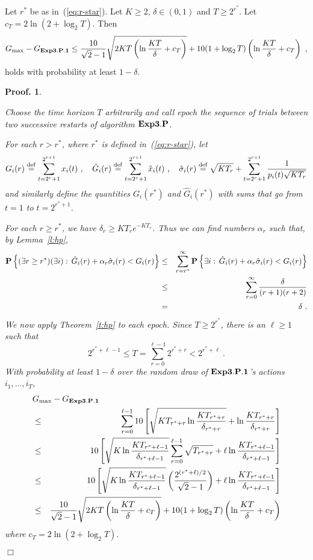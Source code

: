 \documentclass[12pt]{article}
\newcommand{\Aesthp}{{\bf Exp3.P}}
\newcommand{\Aestg}{{\bf Exp3.P.1}}
\newcommand{\defeq}{\stackrel{\rm def}{=}}
\newcommand{\prop}[1]{\mbox{\bf P}\left\{#1\right\}}
\newcommand{\x}[2]{x_{#1}({#2})}
\newcommand{\hG}[2]{\hat{G}_{#1}({#2})}
\newcommand{\hsigma}[2]{\hat{\sigma}_{#1}({#2})}
\newcommand{\G}[2]{G_{#1}({#2})}
\newcommand{\Gbest}{G_{\rm max}}
\newcommand{\p}[2]{p_{#1}(#2)}
\newcommand{\hx}[2]{\hat{x}_{#1}(#2)}
\newtheorem{pproof}{Proof.}
\newenvironment{proof}{
\begin{pproof}
        \begin{rm}\begin{rm}}{
        \hspace*{\fill} $\Box$
        \end{rm}\end{rm}
        \end{pproof}
}
\begin{document}
\begin{theorem}
\label{th:aestg}
Let $r^*$ be as in~(\ref{eq:r-star}).
Let $K \geq 2$, $\delta \in (0,1)$ and $T \geq 2^{r^*}$.
Let $c_T = 2\ln(2+\log_2 T)$.
Then
\[
        \Gbest - G_{\Aestg}
\leq
        \frac{10}{\sqrt{2}-1}\sqrt{2KT\left(\ln\frac{KT}{\delta} + c_T\right)}
        + 10(1+\log_2 T)\left(\ln\frac{KT}{\delta} + c_T\right)~,
\]
holds with probability at least $1-\delta$.
\end{theorem}

\begin{proof} 
Choose the time horizon $T$ arbitrarily and call {\em epoch} the
sequence of trials between two successive restarts of algorithm $\Aesthp$.

For each $r > r^*$, where $r^*$ is defined in~(\ref{eq:r-star}), let
\[
        \G{i}{r} \defeq \sum_{t=2^r+1}^{2^{r+1}} \x{i}{t}~,
\quad
        \hG{i}{r} \defeq \sum_{t=2^r+1}^{2^{r+1}} \hx{i}{t}~,
\quad
        \hsigma{i}{r}
        \defeq \sqrt{KT_r} + \sum_{t=2^r+1}^{2^{r+1}} \frac{1}{\p{i}{t}\sqrt{KT_r}}
\]
and similarly define the quantities $\G{i}{r^*}$ and $\hG{i}{r^*}$ with sums
that go from $t=1$ to $t=2^{r^*+1}$.

For each $r \geq r^*$, we have $\delta_r \geq KT_r e^{-KT_r}$.
Thus we can find numbers $\alpha_r$ such that, by Lemma~\ref{l:hp},
\begin{eqnarray*}
        \prop{(\exists r \geq r^*)(\exists i):\, \hG{i}{r}
        + \alpha_r\hsigma{i}{r} < \G{i}{r}}
& \leq &
        \sum_{r=r^*}^{\infty}
        \prop{\exists i:\, \hG{i}{r} + \alpha_r\hsigma{i}{r} < \G{i}{r}}
\\ & \leq &
        \sum_{r=0}^{\infty}\frac{\delta}{(r+1)(r+2)}
\\ &=&
        \delta~.
\end{eqnarray*}
We now apply Theorem~\ref{t:hp} to each epoch. Since $T \ge 2^{r^*}$,
there is an $\ell \ge 1$ such that
\[
        2^{r^*+\ell-1} \le T = \sum_{r=0}^{\ell-1} 2^{r^*+r} < 2^{r^*+\ell}~.
\]
With probability at least $1-\delta$
over the random draw of $\Aestg$'s actions $i_1,\ldots,i_T$,
\begin{eqnarray*}
\lefteqn{
        \Gbest - G_{\Aestg}
}
\\ & \leq &
        \sum_{r=0}^{\ell-1} 10\left[ \sqrt{KT_{r^*+r}\ln\frac{KT_{r^*+r}}{\delta_{r^*+r}}}
        + \ln\frac{KT_{r^*+r}}{\delta_{r^*+r}}\right]
\\ & \leq &
        10\left[ \sqrt{K\ln\frac{KT_{r^*+\ell-1}}{\delta_{r^*+\ell-1}}}
        \sum_{r=0}^{\ell-1}\sqrt{T_{r^*+r}}
        + \ell\ln\frac{KT_{r^*+\ell-1}}{\delta_{r^*+\ell-1}}\right]
\\ & \leq &
        10\left[ \sqrt{K\ln\frac{KT_{r^*+\ell-1}}{\delta_{r^*+\ell-1}}}
        \left(\frac{2^{(r^*+\ell)/2}}{\sqrt{2}-1}\right)
        + \ell\ln\frac{KT_{r^*+\ell-1}}{\delta_{r^*+\ell-1}}\right]
\\ & \leq &
        \frac{10}{\sqrt{2}-1}\sqrt{2KT\left(\ln\frac{KT}{\delta} + c_T\right)}
        + 10(1+\log_2 T)\left(\ln\frac{KT}{\delta} + c_T\right)
\end{eqnarray*}
where $c_T = 2\ln(2+\log_2 T)$.
\end{proof}
\end{document}
